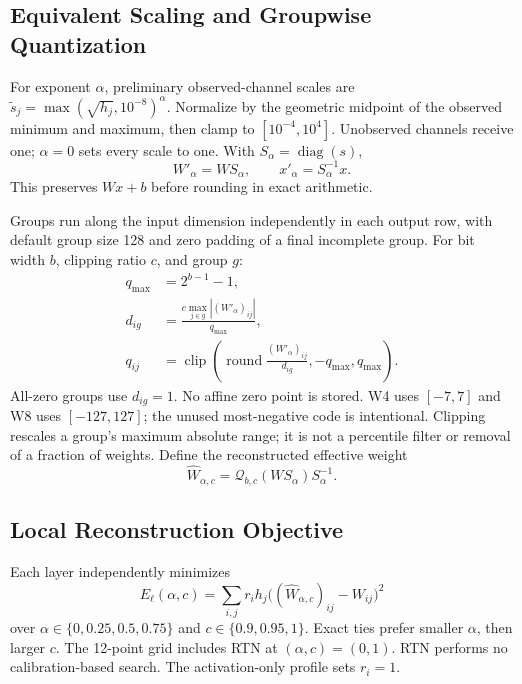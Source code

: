 \documentclass[10pt,twocolumn]{article}
\newcommand{\diag}{\operatorname{diag}}
\newcommand{\clip}{\operatorname{clip}}
\begin{document}
\subsection{Equivalent Scaling and Groupwise Quantization}
For exponent $\alpha$, preliminary observed-channel scales are
$\widetilde s_j=\max(\sqrt{h_j},10^{-8})^\alpha$.
Normalize by the geometric midpoint of the observed minimum and maximum,
then clamp to $[10^{-4},10^4]$. Unobserved channels receive one;
$\alpha=0$ sets every scale to one. With $S_\alpha=\diag(s)$,
\begin{equation}
 W'_\alpha=WS_\alpha,\qquad x'_\alpha=S_\alpha^{-1}x .
\end{equation}
This preserves $Wx+b$ before rounding in exact arithmetic.

Groups run along the input dimension independently in each output row,
with default group size 128 and zero padding of a final incomplete group.
For bit width $b$, clipping ratio $c$, and group $g$:
\begin{align}
 q_{\max}&=2^{b-1}-1,\\
 d_{ig}&=\frac{c\max_{j\in g}|(W'_\alpha)_{ij}|}{q_{\max}},\\
 q_{ij}&=\clip\!\left(
  \operatorname{round}\frac{(W'_\alpha)_{ij}}{d_{ig}},
  -q_{\max},q_{\max}\right).
 \label{eq:quant}
\end{align}
All-zero groups use $d_{ig}=1$. No affine zero point is stored.
W4 uses $[-7,7]$ and W8 uses $[-127,127]$; the unused most-negative
code is intentional. Clipping rescales a group's maximum absolute
range; it is not a percentile filter or removal of a fraction of weights.
Define the reconstructed effective weight
\begin{equation}
 \widehat W_{\alpha,c}
 =\mathcal Q_{b,c}(WS_\alpha)S_\alpha^{-1}.
\end{equation}

\subsection{Local Reconstruction Objective}
Each layer independently minimizes
\begin{equation}
 E_\ell(\alpha,c)=
 \sum_{i,j}r_i h_j
 \big((\widehat W_{\alpha,c})_{ij}-W_{ij}\big)^2
 \label{eq:local}
\end{equation}
over $\alpha\in\{0,0.25,0.5,0.75\}$ and
$c\in\{0.9,0.95,1\}$. Exact ties prefer smaller $\alpha$, then larger $c$.
The 12-point grid includes RTN at $(\alpha,c)=(0,1)$.
RTN performs no calibration-based search.
The activation-only profile sets $r_i=1$.
\end{document}

